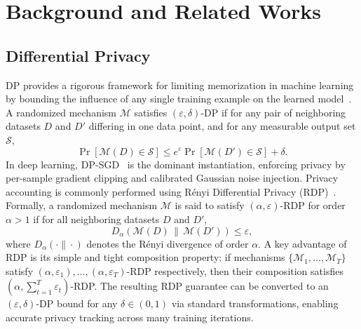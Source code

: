 \documentclass{article}
\theoremstyle{plain}
\theoremstyle{definition}
\theoremstyle{remark}
\begin{document}
\section{Background and Related Works}

\subsection{Differential Privacy}

DP provides a rigorous framework for limiting memorization in machine learning by bounding the influence of any single training example on the learned model~\cite{dwork2006calibrating}. A randomized mechanism $\mathcal{M}$ satisfies $(\varepsilon,\delta)$-DP if for any pair of neighboring datasets $D$ and $D'$ differing in one data point, and for any measurable output set $\mathcal{S}$,
\vskip -0.2in
\begin{equation}
\Pr[\mathcal{M}(D) \in \mathcal{S}] \leq e^{\varepsilon} \Pr[\mathcal{M}(D') \in \mathcal{S}] + \delta.
\end{equation}
In deep learning, DP-SGD~\cite{dpsgd} is the dominant instantiation, enforcing privacy by per-sample gradient clipping and calibrated Gaussian noise injection. Privacy accounting is commonly performed using Rényi Differential Privacy (RDP)~\cite{DBLP:conf/csfw/Mironov17}.
Formally, a randomized mechanism $\mathcal{M}$ is said to satisfy $(\alpha,\varepsilon)$-RDP for order $\alpha > 1$ if for all neighboring datasets $D$ and $D'$,
\begin{equation}
D_{\alpha}\!\left(\mathcal{M}(D)\,\|\,\mathcal{M}(D')\right) \leq \varepsilon,
\end{equation}
where $D_{\alpha}(\cdot\|\cdot)$ denotes the Rényi divergence of order $\alpha$. A key advantage of RDP is its simple and tight composition property: if mechanisms $\{\mathcal{M}_1,\ldots,\mathcal{M}_T\}$ satisfy $(\alpha,\varepsilon_1),\ldots,(\alpha,\varepsilon_T)$-RDP respectively, then their composition satisfies $(\alpha,\sum_{t=1}^T \varepsilon_t)$-RDP. The resulting RDP guarantee can be converted to an $(\varepsilon,\delta)$-DP bound for any $\delta \in (0,1)$ via standard transformations, enabling accurate privacy tracking across many training iterations.
\end{document}
